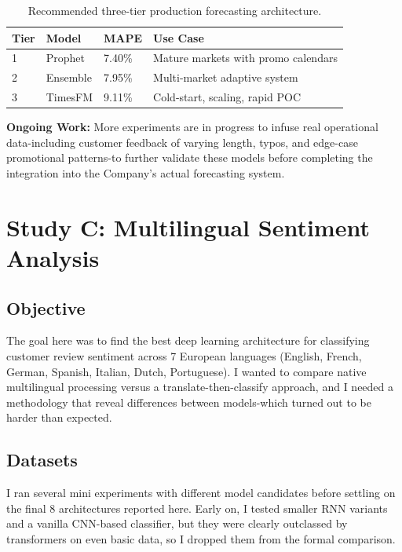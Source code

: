 \documentclass[11pt,a4paper]{article}
\begin{document}
\begin{table}[H]
\caption{Recommended three-tier production forecasting architecture.}
\setlength{\tabcolsep}{16pt}
\renewcommand{\arraystretch}{1.4}
\begin{tabular}{l l l l}
\toprule
\textbf{Tier} & \textbf{Model} & \textbf{MAPE} & \textbf{Use Case} \\
\midrule
1 & Prophet & 7.40\% & Mature markets with promo calendars \\
2 & Ensemble & 7.95\% & Multi-market adaptive system \\
3 & TimesFM & 9.11\% & Cold-start, scaling, rapid POC \\
\bottomrule
\end{tabular}
\end{table}

\textbf{Ongoing Work:} More experiments are in progress to infuse real operational data-including customer feedback of varying length, typos, and edge-case promotional patterns-to further validate these models before completing the integration into the Company's actual forecasting system.

\section{Study C: Multilingual Sentiment Analysis}

\subsection{Objective}
The goal here was to find the best deep learning architecture for classifying customer review sentiment across 7 European languages (English, French, German, Spanish, Italian, Dutch, Portuguese). I wanted to compare native multilingual processing versus a translate-then-classify approach, and I needed a methodology that reveal differences between models-which turned out to be harder than expected.

\subsection{Datasets}

I ran several mini experiments with different model candidates before settling on the final 8 architectures reported here. Early on, I tested smaller RNN variants and a vanilla CNN-based classifier, but they were clearly outclassed by transformers on even basic data, so I dropped them from the formal comparison.
\end{document}
